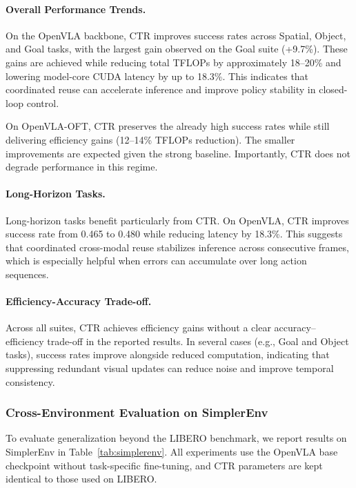 \documentclass[11pt]{article}
\begin{document}
\paragraph{Overall Performance Trends.}
On the OpenVLA backbone, CTR improves success rates across Spatial, Object, and Goal tasks, with the largest gain observed on the Goal suite (+9.7\%). These gains are achieved while reducing total TFLOPs by approximately 18--20\% and lowering model-core CUDA latency by up to 18.3\%. This indicates that coordinated reuse can accelerate inference and improve policy stability in closed-loop control.

On OpenVLA-OFT, CTR preserves the already high success rates while still delivering efficiency gains (12--14\% TFLOPs reduction). The smaller improvements are expected given the strong baseline. Importantly, CTR does not degrade performance in this regime.

\paragraph{Long-Horizon Tasks.}
Long-horizon tasks benefit particularly from CTR. On OpenVLA, CTR improves success rate from 0.465 to 0.480 while reducing latency by 18.3\%. This suggests that coordinated cross-modal reuse stabilizes inference across consecutive frames, which is especially helpful when errors can accumulate over long action sequences.

\paragraph{Efficiency-Accuracy Trade-off.}
Across all suites, CTR achieves efficiency gains without a clear accuracy--efficiency trade-off in the reported results. In several cases (e.g., Goal and Object tasks), success rates improve alongside reduced computation, indicating that suppressing redundant visual updates can reduce noise and improve temporal consistency.



\subsubsection{Cross-Environment Evaluation on SimplerEnv}

To evaluate generalization beyond the LIBERO benchmark, we report results on SimplerEnv in Table~\ref{tab:simplerenv}. All experiments use the OpenVLA base checkpoint without task-specific fine-tuning, and CTR parameters are kept identical to those used on LIBERO.
\end{document}
